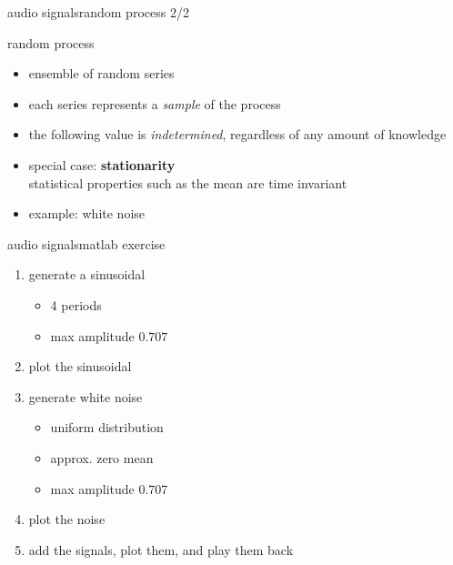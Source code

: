        \begin{frame}{audio signals}{random process 2/2}
            \toremember{}
            
            \begin{block}{random process}
                \begin{itemize}
                    \item   ensemble of random series
                    \item   each series represents a \textit{sample} of the process
                    \item   the following value is \textit{indetermined}, regardless of any amount of knowledge
                \end{itemize}
            \end{block}
            \begin{itemize}
                \item   special case: \textbf{stationarity}\\ statistical properties such as the mean are time invariant
                \item   example: white noise
            \end{itemize}
        \end{frame}

        \begin{frame}{audio signals}{matlab exercise}
            
            \begin{enumerate}
                \item   generate a sinusoidal
                    \begin{itemize}
                        \item   4 periods
                        \item   max amplitude $0.707$
                    \end{itemize}
                \item   plot the sinusoidal
                \item   generate white noise 
                    \begin{itemize}
                        \item   uniform distribution
                        \item   approx. zero mean
                        \item   max amplitude $0.707$
                    \end{itemize}
                \item   plot the noise
                \item   add the signals, plot them, and play them back
            \end{enumerate}
        \end{frame}
            
